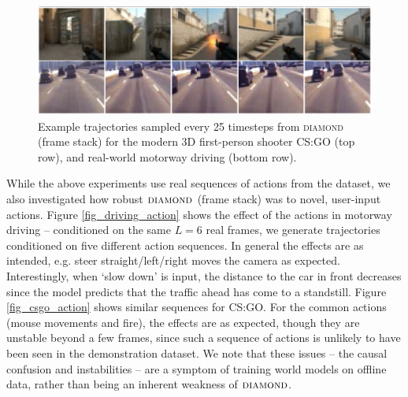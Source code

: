 \begin{figure}[h!]
    \begin{center}
    \includegraphics[width=0.8\columnwidth, height=0.4\columnwidth]{images/generation_egs_02.png}
    \caption{Example trajectories sampled every 25 timesteps from \textsc{diamond} (frame stack) for the modern 3D first-person shooter CS:GO (top row), and real-world motorway driving (bottom row).}
    \label{fig_generation_egs}
    \end{center}
\end{figure}


While the above experiments use real sequences of actions from the dataset, we also investigated how robust $\textsc{diamond}$ (frame stack) was to novel, user-input actions.
Figure \ref{fig_driving_action} shows the effect of the actions in motorway driving -- conditioned on the same $L=6$ real frames, we generate trajectories conditioned on five different action sequences. In general the effects are as intended, e.g. steer straight/left/right moves the camera as expected.
Interestingly, when `slow down' is input, the distance to the car in front decreases since the model predicts that the traffic ahead has come to a standstill.
Figure \ref{fig_csgo_action} shows similar sequences for CS:GO. For the common actions (mouse movements and fire), the effects are as expected, though they are unstable beyond a few frames, since such a sequence of actions is unlikely to have been seen in the demonstration dataset.
We note that these issues -- the causal confusion and instabilities -- are a symptom of training world models on offline data, rather than being an inherent weakness of $\textsc{diamond}$.


